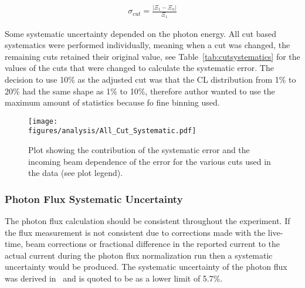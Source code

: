 \begin{align}
\sigma_{cut} = \frac{\left| \Xi_1 - \Xi_n \right|}{\Xi_1}
\end{align}

Some systematic uncertainty depended on the photon energy. All cut based systematics were performed individually, meaning when a cut was changed, the remaining cuts retained their original value, see Table~\ref{tab:cutsystematics} for the values of the cuts that were changed to calculate the systematic error. The decision to use 10\% as the adjusted cut was that the CL distribution from 1\% to 20\% had the same shape as 1\% to 10\%, therefore author wanted to use the maximum amount of statistics because fo fine binning used. 


\begin{figure}[h!]\begin{center}
\texttt{[image: \\figures/analysis/All\_Cut\_Systematic.pdf]}
\caption[Plot showing the contribution of the data cut systematic error and the incoming beam dependence of the error]{\label{fig:sys_cut_error} Plot showing the contribution of the systematic error and the incoming beam dependence of the error for the various cuts used in the data (see plot legend).}
\end{center}\end{figure}
\FloatBarrier
\subsubsection{Photon Flux Systematic Uncertainty}
The photon flux calculation should be consistent throughout the experiment. If the flux measurement is not consistent due to corrections made with the live-time, beam corrections or fractional difference in the reported current to the actual current during the photon flux normalization run then a systematic uncertainty would be produced. The systematic uncertainty of the photon flux was derived in~\cite{g12note} and is quoted to be as a lower limit of 5.7\%.


